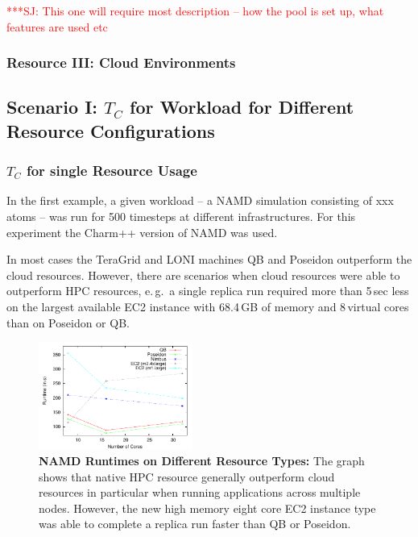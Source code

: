 \documentclass[conference,final]{IEEEtran}
\newcommand{\tc}{$T_{C}$ }
\newcommand{\jhanote}[1]{ {\textcolor{red} { ***SJ: #1 }}}
\newcommand{\jhanote}[1]{}
\begin{document}
\jhanote{This one will require most description -- how the pool is set
up, what features are used etc}

\subsubsection*{Resource III: Cloud Environments}


\subsection{Scenario I: \tc for Workload for Different Resource Configurations}

\subsubsection{\tc for single Resource Usage}

In the first example, a given workload -- a NAMD simulation consisting of xxx atoms --
was run for 500 timesteps at different infrastructures. For this experiment the Charm++ 
version of NAMD was used.

In most cases the TeraGrid and LONI machines QB and Poseidon outperform the cloud resources. 
However, there are scenarios when cloud resources were
able to outperform HPC resources, e.\,g.\ a single replica run required more than 5\,sec less
on the largest available EC2 instance with 68.4\,GB of memory and 8\,virtual cores than on Poseidon
or QB. 

\begin{figure}[htbp]
    \centering
    \includegraphics[width=0.45\textwidth]{performance/namd_run.pdf}
    \caption{\textbf{NAMD Runtimes on Different Resource Types: } The graph shows that 
             native HPC resource generally outperform cloud resources in particular when
             running applications across multiple nodes. However, the new high memory eight 
             core EC2 instance type was able to complete a replica run faster than QB or Poseidon.}
    \label{fig:performance_namd_run}
\end{figure}
\end{document}
